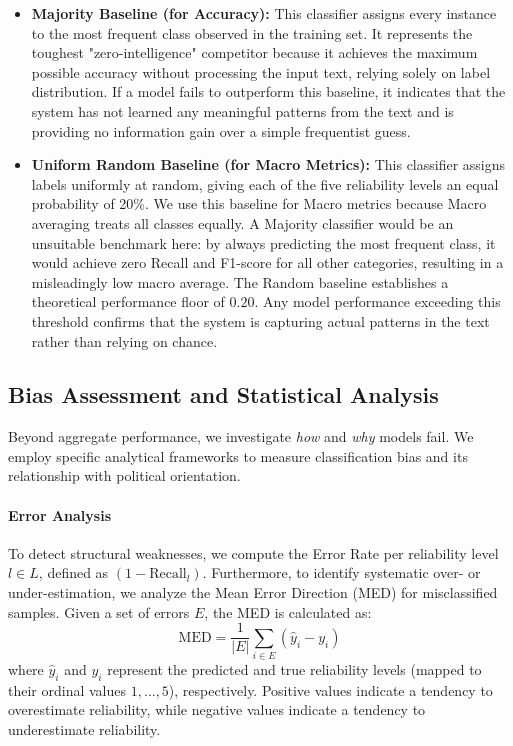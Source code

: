 \documentclass[journal]{IEEEtran}
\begin{document}
\begin{itemize}

    \item \textbf{Majority Baseline (for Accuracy):} This classifier assigns every instance to the most frequent class observed in the training set. It represents the toughest "zero-intelligence" competitor because it achieves the maximum possible accuracy without processing the input text, relying solely on label distribution. If a model fails to outperform this baseline, it indicates that the system has not learned any meaningful patterns from the text and is providing no information gain over a simple frequentist guess.
    
    \item \textbf{Uniform Random Baseline (for Macro Metrics):} This classifier assigns labels uniformly at random, giving each of the five reliability levels an equal probability of 20\%. We use this baseline for Macro metrics because Macro averaging treats all classes equally. A Majority classifier would be an unsuitable benchmark here: by always predicting the most frequent class, it would achieve zero Recall and F1-score for all other categories, resulting in a misleadingly low macro average. The Random baseline establishes a theoretical performance floor of $0.20$. Any model performance exceeding this threshold confirms that the system is capturing actual patterns in the text rather than relying on chance.
    
\end{itemize}

\subsection{Bias Assessment and Statistical Analysis}\label{subsec:bias_methodology}
Beyond aggregate performance, we investigate \textit{how} and \textit{why} models fail. We employ specific analytical frameworks to measure classification bias and its relationship with political orientation.

\paragraph{Error Analysis}

To detect structural weaknesses, we compute the Error Rate per reliability level $l \in L$, defined as $(1 - \mathrm{Recall}_l)$. Furthermore, to identify systematic over- or under-estimation, we analyze the Mean Error Direction (MED) for misclassified samples. Given a set of errors $E$, the MED is calculated as:
\begin{equation}
\mathrm{MED} = \frac{1}{|E|} \sum_{i \in E} (\hat{y}_i - y_i)
\end{equation}
where $\hat{y}_i$ and $y_i$ represent the predicted and true reliability levels (mapped to their ordinal values $1, \dots, 5$), respectively. Positive values indicate a tendency to overestimate reliability, while negative values indicate a tendency to underestimate reliability.
\end{document}
